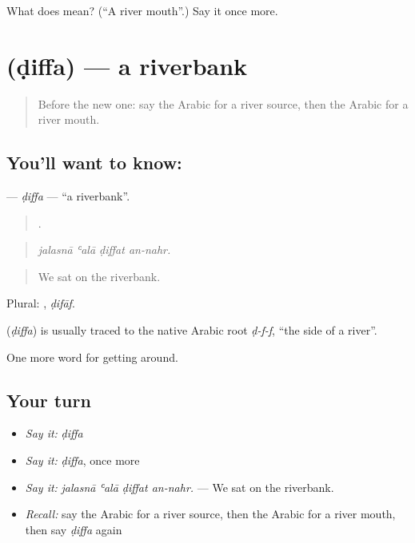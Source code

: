 \begin{tcolorbox}[breakable,colback=teal!4,colframe=teal!35!black,title={Before you move on}]
What does  mean? (\textquotedblleft{}A river mouth\textquotedblright{}.) Say it once more.
\end{tcolorbox}
\section[\texorpdfstring{\ar{ضفة} (ḍiffa)}{ضفة (ḍiffa)}]{ (ḍiffa) — a riverbank}

\label{lesson:AR-C470-diffa}



\begin{quote}
Before the new one: say the Arabic for a river source, then the Arabic for a river mouth.
\end{quote}

\subsection*{You'll want to know: }
\textbf{} — \emph{ḍiffa} — \textquotedblleft{}a riverbank\textquotedblright{}.

\begin{quote}
   .
\end{quote}

\begin{quote}
\emph{jalasnā ʿalā ḍiffat an-nahr.}
\end{quote}

\begin{quote}
We sat on the riverbank.
\end{quote}

Plural: , \emph{ḍifāf}.

\begin{cousinweb}
\textbf{} (\emph{ḍiffa}) is usually traced to the native Arabic root \emph{ḍ-f-f}, \textquotedblleft{}the side of a river\textquotedblright{}.
\end{cousinweb}

\begin{grammarlens}[title={What you've built}]
One more word for getting around.
\end{grammarlens}

\subsection*{Your turn}
\begin{itemize}
\raggedright
  \item \emph{Say it:} \emph{ḍiffa}
  \item \emph{Say it:} \emph{ḍiffa}, once more
  \item \emph{Say it:} \emph{jalasnā ʿalā ḍiffat an-nahr.} — We sat on the riverbank.
  \item \emph{Recall:} say the Arabic for a river source, then the Arabic for a river mouth, then say \emph{ḍiffa} again
\end{itemize}

